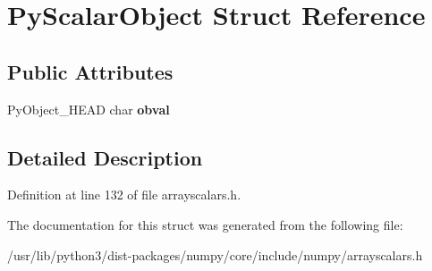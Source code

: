 \hypertarget{structPyScalarObject}{}\section{Py\+Scalar\+Object Struct Reference}
\label{structPyScalarObject}
\subsection*{Public Attributes}
\begin{DoxyCompactItemize}
\item 
Py\+Object\+\_\+\+H\+E\+AD char {\bfseries obval}\hypertarget{structPyScalarObject_abbf52293ec85e1cffa4b340860410461}{}\label{structPyScalarObject_abbf52293ec85e1cffa4b340860410461}

\end{DoxyCompactItemize}


\subsection{Detailed Description}


Definition at line 132 of file arrayscalars.\+h.



The documentation for this struct was generated from the following file\+:\begin{DoxyCompactItemize}
\item 
/usr/lib/python3/dist-\/packages/numpy/core/include/numpy/arrayscalars.\+h\end{DoxyCompactItemize}
